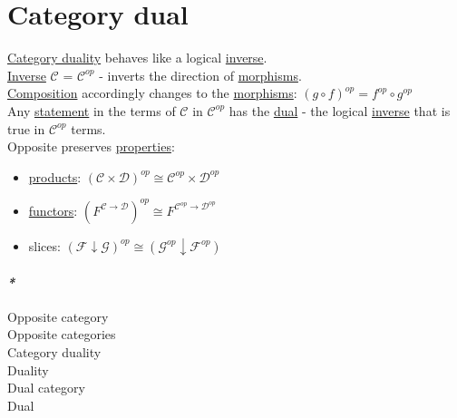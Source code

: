 \documentclass[a4paper,14pt,oneside]{book}
\begin{document}
{\section{\label{org8242191}Category dual}
\label{sec:orged99a24}
\hyperref[org11ff2a2]{Category duality} behaves like a logical \hyperref[org5ab3e3c]{inverse}.\\

\hyperref[org5ab3e3c]{Inverse} \(\mathcal{C}\) = \(\mathcal{C}^{op}\) - inverts the direction of \hyperref[org43d1069]{morphisms}.\\

\hyperref[orgd27cab7]{Composition} accordingly changes to the \hyperref[org43d1069]{morphisms}: \((g \circ f)^{op} = f^{op} \circ g^{op}\)\\

Any \hyperref[org03c7362]{statement} in the terms of \(\mathcal{C}\) in \(\mathcal{C}^{op}\) has the \hyperref[orgdbf0070]{dual} - the logical \hyperref[org5ab3e3c]{inverse} that is true in \(\mathcal {C}^{op}\) terms.\\

Opposite preserves \hyperref[org5fc06ca]{properties}:\\
\begin{itemize}
\item \hyperref[org0d90b2d]{products}: \((\mathcal{C} \times \mathcal{D})^{op} \cong \mathcal{C}^{op} \times \mathcal{D}^{op}\)\\

\item \hyperref[org4c9214f]{functors}: \((F^{\mathcal{C} \to \mathcal{D}})^{op} \cong F^{\mathcal{C}^{op} \to \mathcal{D}^{op}}\)\\

\item slices: \((\mathcal{F} \downarrow \mathcal{G})^{op} \cong (\mathcal{G}^{op} \downarrow \mathcal{F}^{op})\)\\
\end{itemize}

\paragraph{\emph{*}}
\label{sec:org2880869}

\label{org2d4cf39}Opposite category\\
\label{org0379c10}Opposite categories\\
\label{org11ff2a2}Category duality\\
\label{org42aa34a}Duality\\
\label{orgd4e5a51}Dual category\\
\label{orgdbf0070}Dual\\

}
\end{document}
